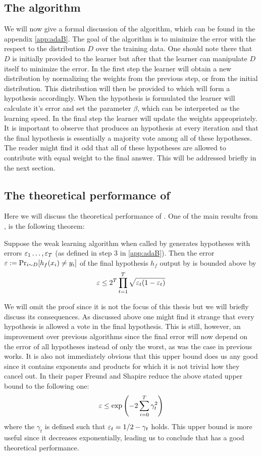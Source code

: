 \subsection{The algorithm}
\label{subsec:algo}
We will now give a formal discussion of the \adaB\cite{Freund1997} algorithm, which can be found in the appendix \ref{app:adaB}. The goal of the algorithm is to minimize the error with the respect to the distribution $D$ over the training data. One should note there that $D$ is initially provided to the learner but after that the learner can manipulate $D$ itself to minimize the error. In the first step the learner will obtain a new distribution by normalizing the weights from the previous step, or from the initial distribution. This distribution will then be provided to \weak which will form a hypothesis accordingly. When the hypothesis is formulated the learner will calculate it's error and set the parameter $\beta$, which can be interpreted as the learning speed. In the final step the learner will update the weights appropriately. It is important to observe that \weak produces an hypothesis at every iteration and that the final hypothesis is essentially a majority vote among all of these hypotheses. The reader might find it odd that all of these hypotheses are allowed to contribute with equal weight to the final answer. This will be addressed briefly in the next section.  

\subsection{The theoretical performance of \adaB}
\label{subsec:perf}
Here we will discuss the theoretical performance of \adaB. One of the main results from \cite{Freund1997}, is the following theorem: 
\begin{theorem}\label{thm:adaErr}\cite{Freund1997}
Suppose the weak learning algorithm \weak when called by \adaB generates hypotheses with errors $\varepsilon_1\ldots, \varepsilon_T$ (as defined in step 3 in \ref{app:adaB}). Then the error \\$\varepsilon:=\Pr_{i\sim D}[h_f(x_i)\neq y_i]$ of the final hypothesis $h_f$ output by \adaB is bounded above by $$\varepsilon\leq 2^T\prod^T_{t=1}\sqrt{\varepsilon_t(1-\varepsilon_t)}$$
\end{theorem}
We will omit the proof since it is not the focus of this thesis but we will briefly discuss its consequences. As discussed above one might find it strange that every hypothesis is allowed a vote in the final hypothesis. This is still, however, an improvement over previous algorithms since the final error will now depend on the error of all hypotheses instead of only the worst, as was the case in previous works. It is also not immediately obvious that this upper bound does us any good since it contains exponents and products for which it is not trivial how they cancel out. In their paper Freund and Shapire reduce the above stated upper bound to the following one: $$\varepsilon\leq \exp\left(-2\sum^T_{i=0}\gamma_t^2\right)$$ where the $\gamma_t$ is defined such that $\varepsilon_t=1/2-\gamma_t$ holds. This upper bound is more useful since it decreases exponentially, leading us to conclude that \adaB has a good theoretical performance.   

